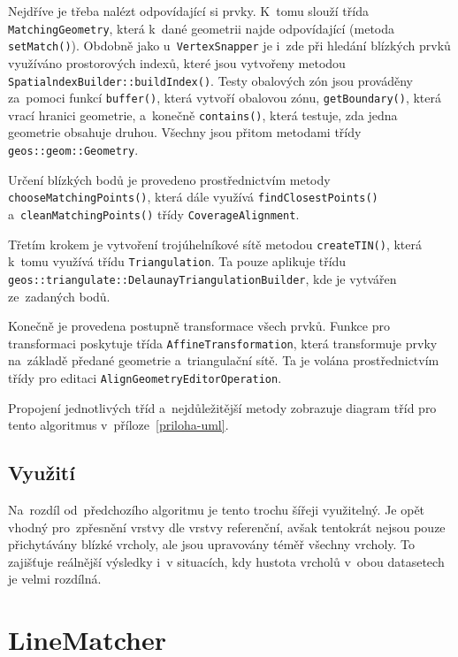 Nejdříve je třeba nalézt odpovídající si prvky. K~tomu slouží třída 
\texttt{Matching\-Geometry}, která k~dané geometrii najde odpovídající
(metoda \texttt{set\-Match()}). Obdobně jako u~\texttt{Vertex\-Snapper} je i~zde 
při hledání blízkých prvků využíváno prostoro\-vých indexů, které jsou 
vytvořeny metodou \texttt{SpatialndexBuilder::build\-Index()}. Testy
obalových zón jsou pro\-vá\-děny za~pomoci funkcí 
\texttt{buffer()}, která vytvoří obalovou zónu, \texttt{getBoundary()},
která vrací hranici geometrie, a~konečně \texttt{contains()}, která
testuje, zda jedna geometrie obsahuje druhou. Všechny jsou přitom
metodami třídy \texttt{geos::geom::Geometry}.

Určení blízkých bodů je provedeno prostřednictvím metody 
\texttt{choose\-Matching\-Points()}, která dále využívá
\texttt{find\-Closest\-Points()} a~\texttt{clean\-Matching\-Points()} 
třídy \texttt{Coverage\-Alignment}.

Třetím krokem je vytvoření trojúhelníkové sítě metodou
\texttt{create\-TIN()}, která k~tomu využívá třídu 
\texttt{Tri\-an\-gu\-la\-tion}.  Ta pouze aplikuje třídu 
\texttt{geos::triangu\-late::Delaunay\-Triangulation\-Builder}, kde je 
vytvářen  ze~zadaných bodů.

Konečně je provedena postupně transformace všech prvků. Funkce pro
transformaci poskytuje třída \texttt{Affine\-Trans\-for\-mation},
která transformuje prvky na~základě předané geometrie a~triangulační
sítě. Ta je volána prostřednictvím třídy pro editaci 
\texttt{Align\-Geo\-metry\-Edi\-tor\-Ope\-ra\-tion}.

Propojení jednotlivých tříd a~nejdůležitější metody zobrazuje 
diagram tříd  pro tento algoritmus v~příloze~\ref{priloha-uml}.


\subsection{Využití}
\label{ca-vyuziti}

Na~rozdíl od~předchozího algoritmu je tento trochu šířeji využitelný. Je opět 
vhodný pro~zpřesnění vrstvy dle vrstvy referenční, avšak tentokrát nejsou 
pouze přichytá\-vány blízké vrcholy, ale jsou upravovány téměř všechny vrcholy. 
To zajišťuje reálnější výsledky i~v situacích, kdy hustota vrcholů v~obou 
datasetech je velmi rozdílná.


\section{LineMatcher}
\label{line matcher}

